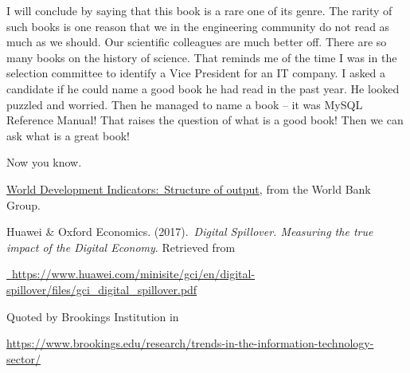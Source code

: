 \begin{multicols}{2}
I will conclude by saying that this book is a rare one of its genre. The rarity of such books is one reason that we in the engineering community do not read as much as we should. Our scientific colleagues are much better off. There are so many books on the history of science.  That reminds me of the time I was in the selection committee to identify a Vice President for an IT company. I asked a candidate if he could name a good book he had read in the past year. He looked puzzled and worried. Then he managed to name a book – it was MySQL Reference Manual! That raises the question of what is a good book! Then we can ask what is a great book!

Now you know. 

\begin{thebibliography}{99}

 \underline{World Development Indicators: Structure of output}, from the World Bank Group.

 Huawei \& Oxford Economics. (2017). \textit{Digital Spillover. Measuring the true impact of the Digital Economy}. Retrieved from

\url{ https://www.huawei.com/minisite/gci/en/digital-spillover/files/gci_digital_spillover.pdf}

Quoted by Brookings Institution in

\url{https://www.brookings.edu/research/trends-in-the-information-technology-sector/}

\end{thebibliography}

  
\end{multicols}

